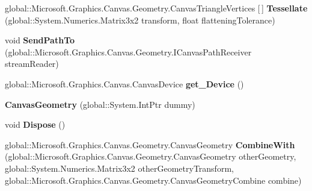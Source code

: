 \begin{DoxyCompactItemize}
\item 
\mbox{\label{class_microsoft_1_1_graphics_1_1_canvas_1_1_geometry_1_1_canvas_geometry_ad81e27003f60c585c31cd07e1bd2a92a}} 
global\+::\+Microsoft.\+Graphics.\+Canvas.\+Geometry.\+Canvas\+Triangle\+Vertices \mbox{[}$\,$\mbox{]} {\bfseries Tessellate} (global\+::\+System.\+Numerics.\+Matrix3x2 transform, float flattening\+Tolerance)
\item 
\mbox{\label{class_microsoft_1_1_graphics_1_1_canvas_1_1_geometry_1_1_canvas_geometry_ac6b1c589bbbc82f3130c0f1164401983}} 
void {\bfseries Send\+Path\+To} (global\+::\+Microsoft.\+Graphics.\+Canvas.\+Geometry.\+I\+Canvas\+Path\+Receiver stream\+Reader)
\item 
\mbox{\label{class_microsoft_1_1_graphics_1_1_canvas_1_1_geometry_1_1_canvas_geometry_a5c318bc4d58999fcf66c9bafd45ffe8b}} 
global\+::\+Microsoft.\+Graphics.\+Canvas.\+Canvas\+Device {\bfseries get\+\_\+\+Device} ()
\item 
\mbox{\label{class_microsoft_1_1_graphics_1_1_canvas_1_1_geometry_1_1_canvas_geometry_aa2808482bc01ed6dfc625b6e9d3ef3ca}} 
{\bfseries Canvas\+Geometry} (global\+::\+System.\+Int\+Ptr dummy)
\item 
\mbox{\label{class_microsoft_1_1_graphics_1_1_canvas_1_1_geometry_1_1_canvas_geometry_a6173265c5e6f97788ac9715a18ee8b03}} 
void {\bfseries Dispose} ()
\item 
\mbox{\label{class_microsoft_1_1_graphics_1_1_canvas_1_1_geometry_1_1_canvas_geometry_aaf62c4106c1df76395cb0e89a2663f79}} 
global\+::\+Microsoft.\+Graphics.\+Canvas.\+Geometry.\+Canvas\+Geometry {\bfseries Combine\+With} (global\+::\+Microsoft.\+Graphics.\+Canvas.\+Geometry.\+Canvas\+Geometry other\+Geometry, global\+::\+System.\+Numerics.\+Matrix3x2 other\+Geometry\+Transform, global\+::\+Microsoft.\+Graphics.\+Canvas.\+Geometry.\+Canvas\+Geometry\+Combine combine)

\end{DoxyCompactItemize}
